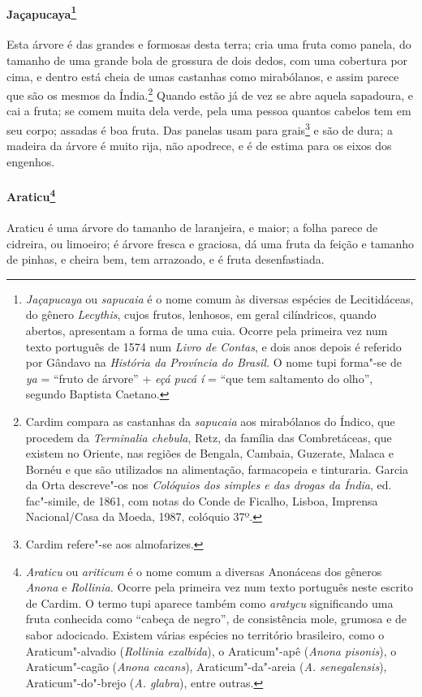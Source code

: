 \paragraph{Jaçapucaya\footnote{ \textit{Jaçapucaya} ou \textit{sapucaia} 
é o nome comum às diversas espécies de Lecitidáceas, do gênero
\textit{Lecythis}, cujos frutos, lenhosos, em geral cilíndricos, quando
abertos, apresentam a forma de uma cuia. Ocorre pela primeira vez num
texto português de 1574 num \textit{Livro de Contas}, e dois anos
depois é referido por Gândavo na \textit{História da Província do
Brasil.} O nome tupi forma"-se de \textit{ya} = ``fruto de árvore'' +
\textit{eçá pucá í} = ``que tem saltamento do olho'', segundo Baptista
Caetano.}} Esta árvore é das grandes e formosas desta terra;
cria uma fruta como panela, do tamanho de uma grande bola de grossura
de dois dedos, com uma cobertura por cima, e dentro está cheia de umas
castanhas como mirabólanos, e assim parece que são os mesmos da
Índia.\footnote{ Cardim compara as castanhas da \textit{sapucaia} aos
mirabólanos do Índico, que procedem da \textit{Terminalia chebula}, 
Retz, da família das Combretáceas, que existem no Oriente, nas regiões
de Bengala, Cambaia, Guzerate, Malaca e Bornéu e que são utilizados na
alimentação, farmacopeia e tinturaria. Garcia da Orta descreve"-os nos
\textit{Colóquios dos simples e das drogas da Índia}, ed. fac"-simile,
de 1861, com notas do Conde de Ficalho, Lisboa, Imprensa Nacional/Casa da Moeda, 1987, colóquio 37º.} Quando estão já de vez se abre
aquela sapadoura, e cai a fruta; se comem muita dela verde, pela uma
pessoa quantos cabelos tem em seu corpo; assadas é boa fruta. Das
panelas usam para grais\footnote{ Cardim refere"-se aos almofarizes.} e
são de dura; a madeira da árvore é muito rija, não apodrece, e é de
estima para os eixos dos engenhos.

\paragraph{Araticu\footnote{ \textit{Araticu} ou \textit{ariticum} é o
nome comum a diversas Anonáceas dos gêneros \textit{Anona} e 
\textit{Rollinia.} Ocorre pela primeira vez num texto português neste
escrito de Cardim. O termo tupi aparece também como \textit{aratycu}
significando uma fruta conhecida como ``cabeça de negro'', de
consistência mole, grumosa e de sabor adocicado. Existem várias
espécies no território brasileiro, como o Araticum"-alvadio
(\textit{Rollinia exalbida}), o Araticum"-apê (\textit{Anona pisonis}), 
o Araticum"-cagão (\textit{Anona cacans}), Araticum"-da"-areia
(\textit{A. senegalensis}), Araticum"-do"-brejo (\textit{A. glabra}), 
entre outras.}} Araticu é uma árvore do tamanho de
laranjeira, e maior; a folha parece de cidreira, ou limoeiro; é árvore
fresca e graciosa, dá uma fruta da feição e tamanho de pinhas, e cheira
bem, tem arrazoado, e é fruta desenfastiada.

